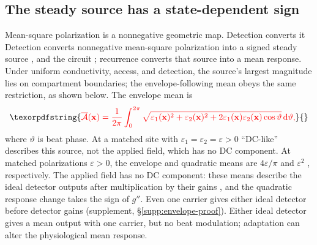 \documentclass[11pt,a4paper]{article}
\providecommand{\DIFaddtex}[1]{{\protect\color{blue} \sf #1}} %
\providecommand{\DIFdeltex}[1]{{\protect\color{red} \scriptsize #1}} %
\providecommand{\DIFaddbegin}{} %
\providecommand{\DIFaddend}{} %
\providecommand{\DIFdelbegin}{} %
\providecommand{\DIFdelend}{} %
\providecommand{\DIFadd}[1]{\texorpdfstring{\DIFaddtex{#1}}{#1}} %
\providecommand{\DIFdel}[1]{\texorpdfstring{\DIFdeltex{#1}}{}} %
\begin{document}
\DIFaddend \subsection{The steady source has a state-dependent sign}\label{sec:dc}
\DIFdelbegin \DIFdel{Mean-square polarization is a nonnegative geometric map. Detection converts it
}\DIFdelend \DIFaddbegin \DIFadd{Detection converts nonnegative mean-square polarization }\DIFaddend into a signed steady
source\DIFdelbegin \DIFdel{, and the circuit }\DIFdelend \DIFaddbegin \DIFadd{; recurrence }\DIFaddend converts that source into a mean response. \DIFdelbegin \DIFdel{Under uniform conductivity, access, and detection, the source's
largest magnitude lies on compartment boundaries; the envelope-following mean
obeys the same restriction, as shown below.
The envelope mean is
}\[
\DIFdel{\overline{\mathcal A}(\mathbf x)=\frac{1}{2\pi}\int_0^{2\pi}
\sqrt{\varepsilon_1(\mathbf x)^2+\varepsilon_2(\mathbf x)^2
+2\varepsilon_1(\mathbf x)\varepsilon_2(\mathbf x)\cos\vartheta}\,\mathrm d\vartheta,
}\]%
\DIFdel{where $\vartheta$ is beat phase. At a matched site with
$\varepsilon_1=\varepsilon_2=\varepsilon>0$}\DIFdelend \DIFaddbegin \DIFadd{``DC-like''
describes this source, not the applied field, which has no DC component.
At matched polarizations $\varepsilon>0$}\DIFaddend ,
the envelope and quadratic means are $4\varepsilon/\pi$ and
$\varepsilon^2$ \DIFdelbegin \DIFdel{, respectively. The applied field has no DC
component: these means describe the ideal detector outputs after multiplication
by their gains , and the quadratic response change takes the sign of $g''$. Even one carrier gives either ideal detector }\DIFdelend \DIFaddbegin \DIFadd{before detector gains (supplement, \S\ref{supp:envelope-proof}). Either ideal detector gives }\DIFaddend a mean
output \DIFaddbegin \DIFadd{with one carrier}\DIFaddend , but no beat\DIFdelbegin \DIFdel{modulation}\DIFdelend ; adaptation can alter the \DIFdelbegin \DIFdel{physiological }\DIFdelend mean response.
\end{document}
